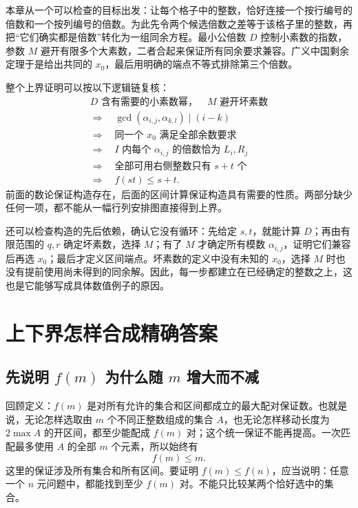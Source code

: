 \documentclass[UTF8,a4paper,oneside,openany,fontset=fandol,zihao=-4]{ctexbook}
\theoremstyle{guide}
\begin{document}
本章从一个可以检查的目标出发：让每个格子中的整数，恰好连接一个按行编号的倍数和一个按列编号的倍数。为此先令两个候选倍数之差等于该格子里的整数，再把“它们确实都是倍数”转化为一组同余方程。最小公倍数 $D$ 控制小素数的指数，参数 $M$ 避开有限多个大素数，二者合起来保证所有同余要求兼容。广义中国剩余定理于是给出共同的 $x_0$，最后用明确的端点不等式排除第三个倍数。

整个上界证明可以按以下逻辑链复核：
\[
\begin{gathered}
D\text{ 含有需要的小素数幂，}\quad M\text{ 避开坏素数}\\
\Longrightarrow\quad
\gcd(\alpha_{i,j},\alpha_{k,l})\mid(i-k)\\
\Longrightarrow\quad
\text{同一个 }x_0\text{ 满足全部余数要求}\\
\Longrightarrow\quad
I\text{ 内每个 }\alpha_{i,j}\text{ 的倍数恰为 }L_i,R_j\\
\Longrightarrow\quad
\text{全部可用右侧整数只有 }s+t\text{ 个}\\
\Longrightarrow\quad f(st)\leq s+t.
\end{gathered}
\]
前面的数论保证构造存在，后面的区间计算保证构造具有需要的性质。两部分缺少任何一项，都不能从一幅行列安排图直接得到上界。

还可以检查构造的先后依赖，确认它没有循环：先给定 $s,t$，就能计算 $D$；再由有限范围的 $q,r$ 确定坏素数，选择 $M$；有了 $M$ 才确定所有模数 $\alpha_{i,j}$，证明它们兼容后再选 $x_0$；最后才定义区间端点。坏素数的定义中没有未知的 $x_0$，选择 $M$ 时也没有提前使用尚未得到的同余解。因此，每一步都建立在已经确定的整数之上，这也是它能够写成具体数值例子的原因。

\chapter{上下界怎样合成精确答案}
\label{rnd:chapter}

\section{\texorpdfstring{先说明 $f(m)$ 为什么随 $m$ 增大而不减}{先说明 f(m) 为什么随 m 增大而不减}}

回顾定义：$f(m)$ 是对所有允许的集合和区间都成立的最大配对保证数。也就是说，无论怎样选取由 $m$ 个不同正整数组成的集合 $A$，也无论怎样移动长度为 $2\max A$ 的开区间，都至少能配成 $f(m)$ 对；这个统一保证不能再提高。一次匹配最多使用 $A$ 的全部 $m$ 个元素，所以始终有
\begin{equation}\label{rnd:trivial-upper}
f(m)\leq m.
\end{equation}
这里的保证涉及所有集合和所有区间。要证明 $f(m)\leq f(n)$，应当说明：任意一个 $n$ 元问题中，都能找到至少 $f(m)$ 对。不能只比较某两个恰好选中的集合。
\end{document}
